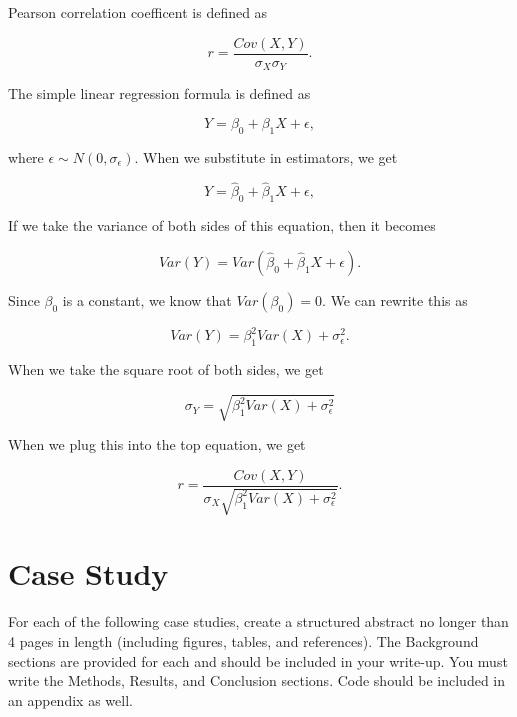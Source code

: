 \documentclass{article}
\begin{document}
\begin{enumerate}
		Pearson correlation coefficent is defined as

		$$r = \frac{Cov(X, Y)}{\sigma_X \sigma_Y}.$$

		The simple linear regression formula is defined as

		$$Y = \beta_0 + \beta_1X + \epsilon,$$

		where $\epsilon \sim N(0, \sigma_\epsilon) $. When we substitute in estimators, we get

		$$Y = \hat\beta_0 + \hat\beta_1X + \epsilon,$$
		
		If we take the variance of both sides of this equation, then it becomes

		$$Var(Y) = Var(\hat\beta_0 + \hat\beta_1X + \epsilon).$$

		Since $\beta_0$ is a constant, we know that $Var(\beta_0) = 0$. We can rewrite this as

		$$Var(Y) = \beta_1^2Var(X) + \sigma_\epsilon^2.$$

		When we take the square root of both sides, we get

		$$\sigma_Y = \sqrt{\beta_1^2Var(X) + \sigma_\epsilon^2} $$

		When we plug this into the top equation, we get

		$$r = \frac{Cov(X, Y)}{\sigma_X \sqrt{\beta_1^2Var(X) + \sigma_\epsilon^2}}.$$


		




	\end{enumerate}



	\newpage
	\section*{Case Study}
	For each of the following case studies, create a structured abstract no longer than 4 pages in length (including figures, tables, and references). The Background sections are provided for each and should be included in your write-up. You must write the Methods, Results, and Conclusion sections. Code should be included in an appendix as well.
\end{document}
